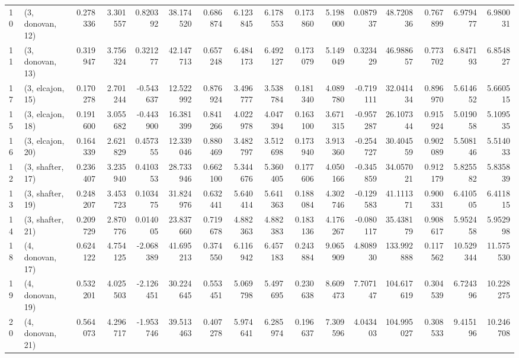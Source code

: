 \begin{tabular}{llrrrrrrrrrrrrrr}
10 &  (3, donovan, 12) &   0.278336 &  3.301557 &  0.820392 &  38.174520 &  0.686874 &   6.123845 &  6.178553 &  0.173860 &  5.198000 &  0.087937 &   48.720836 &  0.767899 &   6.979477 &   6.980031 \\
11 &  (3, donovan, 13) &   0.319947 &  3.756324 &  0.321277 &  42.147713 &  0.657248 &   6.484173 &  6.492127 &  0.173079 &  5.149049 &  0.323429 &   46.988657 &  0.773702 &   6.847193 &   6.854827 \\
17 &  (3, elcajon, 15) &   0.170278 &  2.701244 & -0.543637 &  12.522992 &  0.876924 &   3.496777 &  3.538784 &  0.181340 &  4.089780 & -0.719111 &   32.041434 &  0.896970 &   5.614652 &   5.660515 \\
15 &  (3, elcajon, 18) &   0.191600 &  3.055682 & -0.443900 &  16.381399 &  0.841266 &   4.022978 &  4.047394 &  0.163100 &  3.671315 & -0.957287 &   26.107344 &  0.915924 &   5.019058 &   5.109535 \\
16 &  (3, elcajon, 20) &   0.164339 &  2.621829 &  0.457355 &  12.339046 &  0.880469 &   3.482797 &  3.512698 &  0.173940 &  3.913360 & -0.254727 &   30.404559 &  0.902089 &   5.508146 &   5.514033 \\
12 &  (3, shafter, 17) &   0.236407 &  3.235940 &  0.410353 &  28.733946 &  0.662100 &   5.344676 &  5.360405 &  0.177606 &  4.050166 & -0.345859 &   34.057021 &  0.912179 &   5.825582 &   5.835839 \\
13 &  (3, shafter, 19) &   0.248207 &  3.453723 &  0.103475 &  31.824976 &  0.632441 &   5.640414 &  5.641363 &  0.188084 &  4.302746 & -0.129583 &   41.111371 &  0.900331 &   6.410505 &   6.411815 \\
14 &  (3, shafter, 21) &   0.209729 &  2.870776 &  0.014005 &  23.837660 &  0.719678 &   4.882363 &  4.882383 &  0.183136 &  4.176267 & -0.080117 &   35.438179 &  0.908617 &   5.952458 &   5.952998 \\
18 &  (4, donovan, 17) &   0.624122 &  4.754125 & -2.068389 &  41.695213 &  0.374550 &   6.116942 &  6.457183 &  0.243884 &  9.065909 &  4.808930 &  133.992888 &  0.117562 &  10.529344 &  11.575530 \\
19 &  (4, donovan, 19) &   0.532201 &  4.025503 & -2.126451 &  30.224645 &  0.553451 &   5.069798 &  5.497695 &  0.230638 &  8.609473 &  7.707147 &  104.617619 &  0.304539 &   6.724396 &  10.228275 \\
20 &  (4, donovan, 21) &   0.564073 &  4.296717 & -1.953746 &  39.513463 &  0.407278 &   5.974641 &  6.285974 &  0.196637 &  7.309596 &  4.043403 &  104.995027 &  0.308533 &   9.415196 &  10.246708 \\

\end{tabular}
